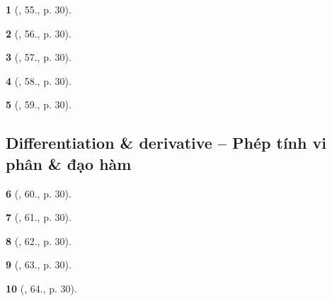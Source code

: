 \documentclass{article}
\newtheorem{baitoan}{}
\begin{document}
\begin{baitoan}[\cite{Doanh_Tuan_Pascal}, 55., p. 30]
	
\end{baitoan}

\begin{baitoan}[\cite{Doanh_Tuan_Pascal}, 56., p. 30]
	
\end{baitoan}

\begin{baitoan}[\cite{Doanh_Tuan_Pascal}, 57., p. 30]
	
\end{baitoan}

\begin{baitoan}[\cite{Doanh_Tuan_Pascal}, 58., p. 30]
	
\end{baitoan}

\begin{baitoan}[\cite{Doanh_Tuan_Pascal}, 59., p. 30]
	
\end{baitoan}


\subsection{Differentiation \& derivative -- Phép tính vi phân \& đạo hàm}

\begin{baitoan}[\cite{Doanh_Tuan_Pascal}, 60., p. 30]
	
\end{baitoan}

\begin{baitoan}[\cite{Doanh_Tuan_Pascal}, 61., p. 30]
	
\end{baitoan}

\begin{baitoan}[\cite{Doanh_Tuan_Pascal}, 62., p. 30]
	
\end{baitoan}

\begin{baitoan}[\cite{Doanh_Tuan_Pascal}, 63., p. 30]
	
\end{baitoan}

\begin{baitoan}[\cite{Doanh_Tuan_Pascal}, 64., p. 30]
	
\end{baitoan}
\end{document}
